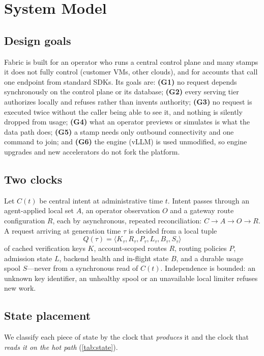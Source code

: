 \documentclass[conference,letterpaper]{IEEEtran}
\newcommand{\sys}{Fabric}
\begin{document}
\section{System Model}
\label{sec:model}

\subsection{Design goals}
\label{sec:goals}
\sys{} is built for an operator who runs a central control plane and many stamps it does not
fully control (customer VMs, other clouds), and for accounts that call one endpoint from
standard SDKs. Its goals are: \textbf{(G1)} no request depends synchronously on the control
plane or its database; \textbf{(G2)} every serving tier authorizes locally and refuses
rather than invents authority; \textbf{(G3)} no request is executed twice without the caller
being able to see it, and nothing is silently dropped from usage; \textbf{(G4)} what an
operator previews or simulates is what the data path does; \textbf{(G5)} a stamp needs only
outbound connectivity and one command to join; and \textbf{(G6)} the engine (vLLM) is used
unmodified, so engine upgrades and new accelerators do not fork the platform.

\subsection{Two clocks}
Let $C(t)$ be central intent at administrative time $t$. Intent passes through an
agent-applied local set $A$, an operator observation $O$ and a gateway route configuration
$R$, each by asynchronous, repeated reconciliation: $C \rightarrow A \rightarrow O
\rightarrow R$. A request arriving at generation time $\tau$ is decided from a local tuple
\begin{equation}
  Q(\tau) = \langle K_\tau, R_\tau, P_\tau, L_\tau, B_\tau, S_\tau \rangle
\end{equation}
of cached verification keys $K$, account-scoped routes $R$, routing policies $P$, admission
state $L$, backend health and in-flight state $B$, and a durable usage spool $S$---never from
a synchronous read of $C(t)$. Independence is bounded: an unknown key identifier, an
unhealthy spool or an unavailable local limiter refuses new work.

\subsection{State placement}
We classify each piece of state by the clock that \emph{produces} it and the clock that
\emph{reads it on the hot path} (\cref{tab:state}).
\end{document}
